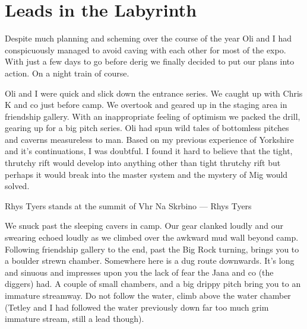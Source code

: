 \begin{marginfigure}
\end{marginfigure}

\section{Leads in the Labyrinth}
 
Despite much planning and scheming over the course of the year Oli and I had conspicuously managed to avoid caving with each other for most of the expo. With just a few days to go before derig we finally decided to put our plans into action. On a night train of course.
 
Oli and I were quick and slick down the entrance series. We caught up with Chris K and co just before camp. We overtook and geared up in the staging area in friendship gallery. With an inappropriate feeling of optimism we packed the drill, gearing up for a big pitch series. Oli had spun wild tales of bottomless pitches and caverns measureless to man. Based on my previous experience of Yorkshire and it’s continuations, I was doubtful. I found it hard to believe that the tight, thrutchy rift would develop into anything other than tight thrutchy rift but perhaps it would break into the master system and the mystery of Mig would solved. 


 \begin{marginfigure}
\centering
{}
\label{Rhys Skrbina}
\caption{Rhys Tyers stands at the summit of Vhr Na Skrbino --- Rhys Tyers}
\end{marginfigure}

 
We snuck past the sleeping cavers in camp. Our gear clanked loudly and our swearing echoed loudly as we climbed over the awkward mud wall beyond camp. Following friendship gallery to the end, past the Big Rock turning, brings you to a boulder strewn chamber. Somewhere here is a dug route downwards. It’s long and sinuous and impresses upon you the lack of fear the Jana and co (the diggers) had. A couple of small chambers, and a big drippy pitch bring you to an immature streamway. Do not follow the water, climb above the water chamber (Tetley and I had followed the water previously down far too much grim immature stream, still a lead though). 
 
